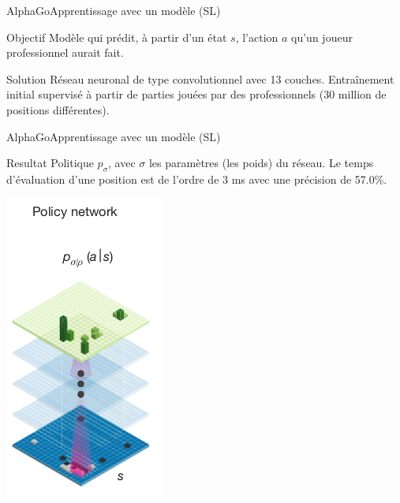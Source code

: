 \begin{frame}{AlphaGo}{Apprentissage avec un modèle (SL)}
    \begin{center}

        \begin{block}{Objectif}
            Modèle qui prédit, à partir d'un état $s$, l'action $a$ qu'un joueur professionnel aurait fait.
        \end{block}
        \vspace{1cm}
        \begin{block}{Solution}
            Réseau neuronal de type convolutionnel avec 13 couches.
            Entraînement initial supervisé à partir de parties jouées par des professionnels (30 million de positions différentes).
        \end{block}
    \end{center}
\end{frame}

\begin{frame}{AlphaGo}{Apprentissage avec un modèle (SL)}
    \begin{block}{Resultat}
        Politique $p_\sigma$, avec $\sigma$ les paramètres (les poids) du réseau.
        Le temps d'évaluation d'une position est de l'ordre de 3 ms avec une précision de 57.0\%.
    \end{block}
    \begin{center}
        \includegraphics[scale=0.4]{ressources/AlphaGo/Policy_Network}
    \end{center}
\end{frame}

